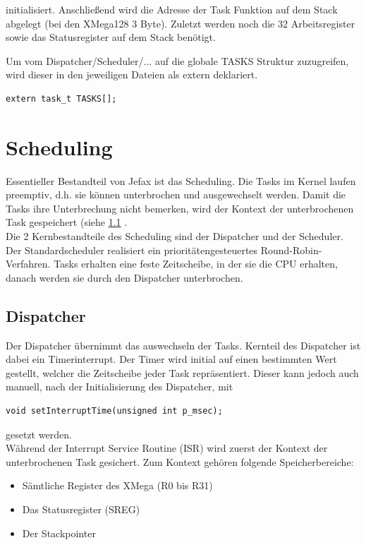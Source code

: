 \documentclass[fontsize=12pt, toc=bibliography, notitlepage]{scrreprt}
\newcommand{\refnn}[1]{\ref{#1} \nameref{#1}}
\begin{document}
initialisiert. Anschließend wird die Adresse der Task Funktion auf dem Stack abgelegt (bei den XMega128 3 Byte). Zuletzt werden noch die 32 Arbeitsregister sowie das Statusregister auf dem Stack benötigt.

Um vom Dispatcher/Scheduler/... auf die globale TASKS Struktur zuzugreifen, wird dieser in den jeweiligen Dateien als extern deklariert.

\begin{lstlisting}
extern task_t TASKS[];
\end{lstlisting}

\chapter{Scheduling}
\label{chap:scheduling}
Essentieller Bestandteil von Jefax ist das Scheduling. Die Tasks im Kernel laufen preemptiv, d.h. sie können unterbrochen und ausgewechselt werden. Damit die Tasks ihre Unterbrechung nicht bemerken, wird der Kontext der unterbrochenen Task gespeichert (siehe \refnn{sec:dispatcher}.\\
Die 2 Kernbestandteile des Scheduling sind der Dispatcher und der Scheduler. Der Standardscheduler realisiert ein prioritätengesteuertes Round-Robin-Verfahren. Tasks erhalten eine feste Zeitscheibe, in der sie die CPU erhalten, danach werden sie durch den Dispatcher unterbrochen.

\section{Dispatcher}
\label{sec:dispatcher}
Der Dispatcher übernimmt das auswechseln der Tasks. Kernteil des Dispatcher ist dabei ein Timerinterrupt. Der Timer wird initial auf einen bestimmten Wert gestellt, welcher die Zeitscheibe jeder Task repräsentiert. Dieser kann jedoch auch manuell, nach der Initialisierung des Dispatcher, mit

\begin{lstlisting}
void setInterruptTime(unsigned int p_msec);
\end{lstlisting}

gesetzt werden.\\

Während der Interrupt Service Routine (ISR) wird zuerst der Kontext der unterbrochenen Task gesichert. Zum Kontext gehören folgende Speicherbereiche:

\begin{itemize}
	\item Sämtliche Register des XMega (R0 bis R31)
	\item Das Statusregister (SREG)
	\item Der Stackpointer
\end{itemize}
\end{document}
